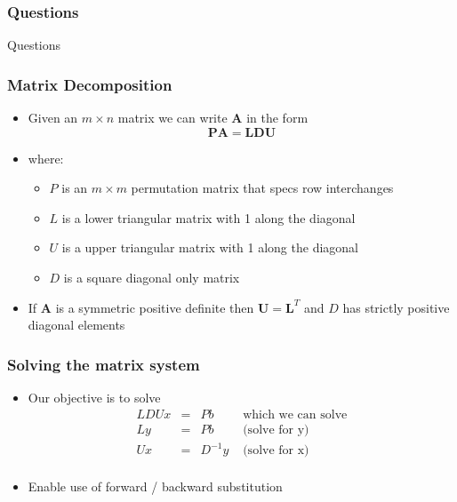\documentclass[10pt]{beamer}
\begin{document}
\begin{frame}
  \frametitle{Questions}
  \centerline{\Huge Questions}
\end{frame}

\begin{frame}
  \frametitle{Matrix Decomposition}
  \begin{itemize}
  \item Given an $ m \times n$ matrix we can write $\mathbf{A}$ in the form
    \[
      \mathbf{P}\mathbf{A} = \mathbf{L} \mathbf{D} \mathbf{U}
    \]
  \item where:
    \begin{itemize}
    \item $P$ is an $m \times m$ permutation matrix that specs row interchanges
    \item $L$ is a lower triangular matrix with 1 along the diagonal
    \item $U$ is a upper triangular matrix with 1 along the diagonal
    \item $D$ is a square diagonal only matrix
    \end{itemize}
  \item If $\mathbf{A}$ is a symmetric positive definite then
    $\mathbf{U} = \mathbf{L}^T$ and $D$ has strictly positive diagonal
    elements
  \end{itemize}
\end{frame}

\begin{frame}
  \frametitle{Solving the matrix system}
  \begin{itemize}
  \item Our objective is to solve
    \[
      \begin{array}{cccl}
        LDU x &= & P b & \mbox{ which we can solve}\\
        L y   &= & P b & \mbox{ (solve for y)}\\
        U x   &= & D^{-1} y & \mbox{ (solve for x)}\\
      \end{array}
    \]
  \item Enable use of forward / backward substitution 
  \end{itemize}
\end{frame}
\end{document}
